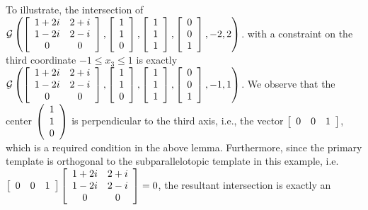%
To illustrate, the intersection of $\mathcal{G}\left(\left[\begin{array}{cc}1+2i &
2+i\\1-2i & 2-i\\0 &
0\end{array}\right],\left[\begin{array}{c}1\\1\\0\end{array}\right],\left[\begin{array}{c}1\\1\\1\end{array}\right],\left[\begin{array}{c}0\\0\\1\end{array}\right],-2,2\right)$. with a
constraint on the third coordinate $-1\leq x_3\leq 1$ is exactly\\
$\mathcal{G}\left(\left[\begin{array}{cc}1+2i & 2+i\\1-2i & 2-i\\0 &
0\end{array}\right],\left[\begin{array}{c}1\\1\\0\end{array}\right],\left[\begin{array}{c}1\\1\\1\end{array}\right],\left[\begin{array}{c}0\\0\\1\end{array}\right],-1,1\right)$.  We observe that
the center $\left(\begin{array}{c}1\\1\\0\end{array}\right)$ is
perpendicular to the third axis, i.e., the vector
$\left[\begin{array}{ccc}0 & 0 & 1\end{array}\right]$, which is a required
condition in the above lemma.  Furthermore, since the primary template
is orthogonal to the subparallelotopic template in this example, i.e.
$\left[\begin{array}{ccc}0 & 0 &
1\end{array}\right]\left[\begin{array}{cc}1+2i & 2+i\\1-2i & 2-i\\0 &
0\end{array}\right]=0$, the resultant intersection is exactly an
